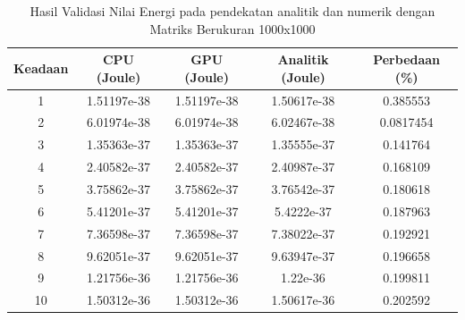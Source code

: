 \begin{table}[H]
	\centering
	\caption{Hasil Validasi Nilai Energi pada pendekatan analitik dan numerik dengan Matriks Berukuran 1000x1000}
	\label{tab:result_validation_2}
	\begin{tabular}{|c|c|c|c|c|}
		\hline
		\textbf{Keadaan} & \textbf{CPU (Joule)} & \textbf{GPU (Joule)} & \textbf{Analitik (Joule)} & \textbf{Perbedaan (\%)} \\
		\hline
		1                & 1.51197e-38          & 1.51197e-38          & 1.50617e-38               & 0.385553                \\
		2                & 6.01974e-38          & 6.01974e-38          & 6.02467e-38               & 0.0817454               \\
		3                & 1.35363e-37          & 1.35363e-37          & 1.35555e-37               & 0.141764                \\
		4                & 2.40582e-37          & 2.40582e-37          & 2.40987e-37               & 0.168109                \\
		5                & 3.75862e-37          & 3.75862e-37          & 3.76542e-37               & 0.180618                \\
		6                & 5.41201e-37          & 5.41201e-37          & 5.4222e-37                & 0.187963                \\
		7                & 7.36598e-37          & 7.36598e-37          & 7.38022e-37               & 0.192921                \\
		8                & 9.62051e-37          & 9.62051e-37          & 9.63947e-37               & 0.196658                \\
		9                & 1.21756e-36          & 1.21756e-36          & 1.22e-36                  & 0.199811                \\
		10               & 1.50312e-36          & 1.50312e-36          & 1.50617e-36               & 0.202592                \\
		\hline
	\end{tabular}
\end{table}

